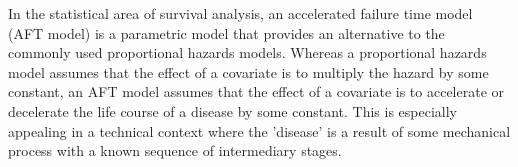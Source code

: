 In the statistical area of survival analysis, an accelerated failure time model (AFT model) is a parametric model that provides an alternative to the commonly used proportional hazards models. Whereas a proportional hazards model assumes that the effect of a covariate is to multiply the hazard by some constant, an AFT model assumes that the effect of a covariate is to accelerate or decelerate the life course of a disease by some constant. This is especially appealing in a technical context where the 'disease' is a result of some mechanical process 
with a known sequence of intermediary stages.

